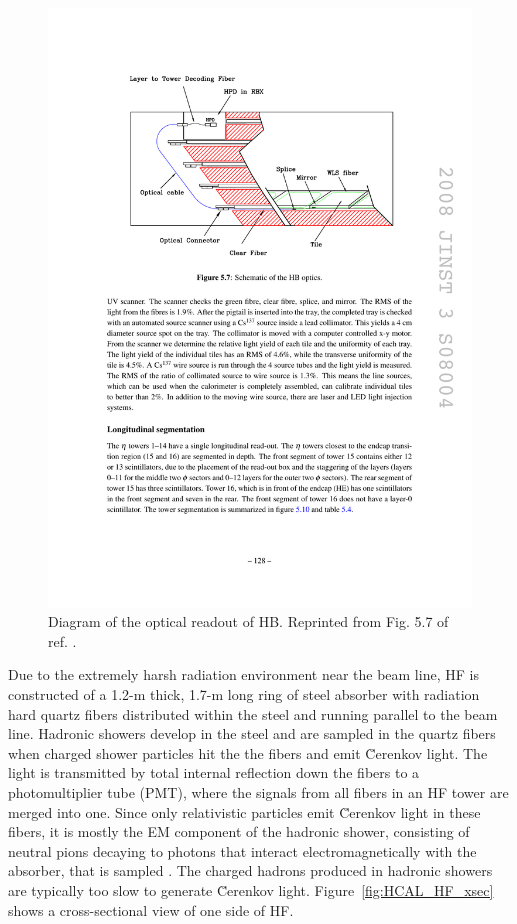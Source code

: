 \documentclass[dissertation.tex]{subfiles}
\begin{document}
\begin{figure}
	\centering
	\includegraphics[scale=1.0]{HCAL_HB_optics}
	\caption{Diagram of the optical readout of HB.  Reprinted from Fig. 5.7 of ref. \cite{CMS_detector_paper}.}
	\label{fig:HCAL_HB_optics}
\end{figure}

Due to the extremely harsh radiation environment near the beam line, HF is constructed of a 1.2-m thick, 1.7-m long ring of steel absorber with radiation hard quartz fibers distributed within the steel and running parallel to the beam line.  Hadronic showers develop in the steel and are sampled in the quartz fibers when charged shower particles hit the the fibers and emit \u{C}erenkov light.  The light is transmitted by total internal reflection down the fibers to a photomultiplier tube (PMT), where the signals from all fibers in an HF tower are merged into one.  Since only relativistic particles emit \u{C}erenkov light in these fibers, it is mostly the EM component of the hadronic shower, consisting of neutral pions decaying to photons that interact electromagnetically with the absorber, that is sampled \cite{Akchurin_Wigmans}.  The charged hadrons produced in hadronic showers are typically too slow to generate \u{C}erenkov light.  Figure~\ref{fig:HCAL_HF_xsec} shows a cross-sectional view of one side of HF.
\end{document}
